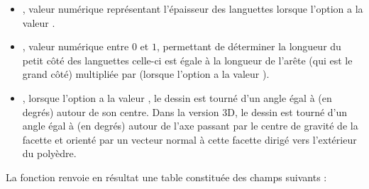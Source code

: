 \begin{itemize}
    \item {}, valeur numérique représentant l'épaisseur des languettes lorsque l'option  a la valeur \true.
    
    \item {}, valeur numérique entre $0$ et $1$, permettant de déterminer la longueur du petit côté des languettes  celle-ci est égale à la longueur de l'arête (qui est le grand côté) multipliée par  (lorsque l'option  a la valeur \true).
    
    \item {}, lorsque l'option  a la valeur \true, le dessin est tourné d'un angle égal à  (en degrés) autour de son centre. Dans la version 3D, le dessin est tourné d'un angle égal à  (en degrés) autour de l'axe passant par le centre de gravité de la facette  et orienté par un vecteur normal à cette facette dirigé vers l'extérieur du polyèdre.
\end{itemize}

La fonction renvoie en résultat une table constituée des champs suivants :

